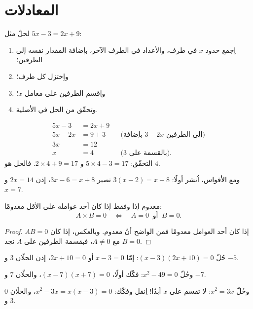 \section{المعادلات}

\begin{method}\label{met:g9:algebra:firstdegree}
لحلّ  مثل $5x - 3 = 2x + 9$:
\begin{enumerate}
  \item اِجمع حدود $x$ في طرف، والأعداد في الطرف الآخر، بإضافة
        المقدار نفسه إلى الطرفين؛
  \item واِختزل كل طرف؛
  \item واِقسم الطرفين على معامل $x$؛
  \item وتحقّق من الحل في  الأصلية.
\end{enumerate}
\end{method}

\begin{example}\label{ex:g9:algebra:firstdegree}
\begin{align*}
5x - 3 &= 2x + 9 \\
5x - 2x &= 9 + 3 && \text{(بإضافة $3 - 2x$ إلى الطرفين)}\\
3x &= 12 \\
x &= 4 && \text{(بالقسمة على 3).}
\end{align*}
التحقّق: $5 \times 4 - 3 = 17$ و $2 \times 4 + 9 = 17$. فالحل هو
$4$.

ومع الأقواس، اُنشر أولًا: $3(x - 2) = x + 8$ تصير $3x - 6 = x + 8$،
إذن $2x = 14$ و $x = 7$.
\end{example}

\begin{theorem}\label{thm:g9:algebra:zeroproduct}
 معدوم إذا وفقط إذا كان أحد عوامله على الأقل معدومًا:
\[
A \times B = 0
\quad\Longleftrightarrow\quad
A = 0 \ \text{ أو } \ B = 0 .
\]
\end{theorem}

\begin{proof}
إذا كان أحد العوامل معدومًا فمن الواضح أنّ  معدوم.
وبالعكس، إذا كان $A B = 0$ مع $A \neq 0$، فبقسمة الطرفين على $A$
نجد $B = 0$.
\end{proof}

\begin{example}\label{ex:g9:algebra:zeroproduct}
حُلّ $(x - 3)(2x + 10) = 0$: إمّا $x - 3 = 0$ أو $2x + 10 = 0$،
إذن الحلّان $3$ و $-5$.

وحُلّ $x^2 - 49 = 0$: فكّك أولًا، $(x-7)(x+7) = 0$، والحلّان $7$
و $-7$.

وحُلّ $x^2 = 3x$: لا تقسم على $x$ أبدًا! اِنقل وفكّك:
$x^2 - 3x = x(x - 3) = 0$، والحلّان $0$ و $3$.
\end{example}

